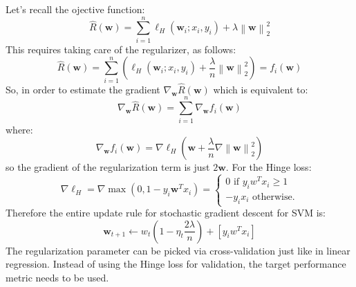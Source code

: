 \documentclass[a4paper,10pt,twoside]{article}
\newcommand\norm[1]{\left\lVert#1\right\rVert}
\begin{document}
Let's recall the ojective function:
\begin{equation*}
    \hat{R}(\mathbf{w})=\sum_{i=1}^{n}\ell_{H}(\mathbf{w}_i; x_i,y_i) + \lambda\norm{\mathbf{w}}_2^2
\end{equation*}
This requires taking care of the regularizer, as follows:
\begin{equation*}
    \hat{R}(\mathbf{w})=\sum_{i=1}^{n}\left(\ell_{H}(\mathbf{w}_i; x_i,y_i) + \frac{\lambda}{n}\norm{\mathbf{w}}_2^2\right)=f_i(\mathbf{w})
\end{equation*}
So, in order to estimate the gradient $\nabla_{\mathbf{w}}\hat{R}(\mathbf{w})$ which is equivalent to:
\begin{equation*}
    \nabla_{\mathbf{w}}\hat{R}(\mathbf{w})=\sum_{i=1}^{n}\nabla_{\mathbf{w}}f_{i}(\mathbf{w})
\end{equation*}
where:
\begin{equation*}
    \nabla_{\mathbf{w}}f_{i}(\mathbf{w}) = \nabla\ell_{H}(\mathbf{w}+\frac{\lambda}{n}\nabla\norm{\mathbf{w}}_2^2)
\end{equation*}
so the gradient of the regularization term is just $2\mathbf{w}$. For the Hinge loss:
\begin{equation*}
    \nabla\ell_H = \nabla\max(0,1-y_i\mathbf{w}^Tx_i)
    = \begin{cases}
        0\text{ if } y_iw^Tx_i\geq 1\\
        -y_ix_i\text{ otherwise.}
    \end{cases}
\end{equation*}
Therefore the entire update rule for stochastic gradient descent for SVM is:
\begin{equation*}
    \mathbf{w}_{t+1}\leftarrow w_t\left(1-\eta_t\frac{2\lambda}{n}\right)+\left[y_iw^Tx_i\right]
\end{equation*}
The regularization parameter can be picked via cross-validation just like in linear regression. Instead of using the Hinge loss for validation, the target performance metric needs to be used.
\end{document}
